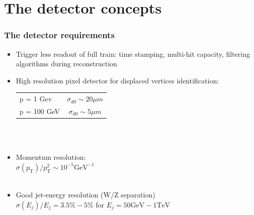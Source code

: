 \documentclass{beamer}
\begin{document}
\section{The detector concepts}
\begin{frame}
\frametitle{The detector requirements}
\begin{itemize}
  \item Trigger less readout of full train: time stamping, multi-hit capacity,
  filtering algorithms during reconstruction
  \item High resolution pixel detector for displaced vertices identification:\\
  {\scriptsize
  \begin{tabular}{lc}
  p = 1 Gev & $\sigma_{d0}\sim20\mu m$\\
  p = 100 GeV & $\sigma_{d0}\sim5\mu m$
  \end{tabular}
  }~\\ ~\\
  \item Momentum resolution:\\
  {\scriptsize 
  $\sigma(p_{\textrm{T}})/p_{\textrm{T}}^2\sim 10^{-5}\textrm{GeV}^{-1}$
   }~\\ ~\\
  \item Good jet-energy resolution (W/Z separation)\\
  {\scriptsize 
$\sigma(E_j)/E_j = 3.5\%-5\%$ for $E_j = 50\textrm{GeV}-1\textrm{TeV}$
  }~\\ ~\\
  
\end{itemize}
\end{frame}
\end{document}
